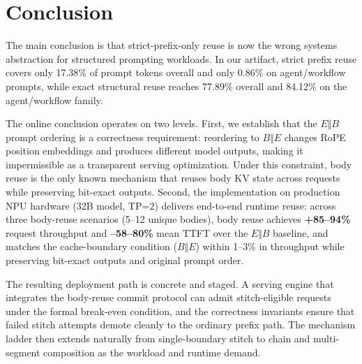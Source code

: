 \documentclass[conference]{IEEEtran}
\begin{document}
\section{Conclusion}

The main conclusion is that strict-prefix-only reuse is now the wrong systems abstraction for structured prompting workloads. In our artifact, strict prefix reuse covers only 17.38\% of prompt tokens overall and only 0.86\% on agent/workflow prompts, while exact structural reuse reaches 77.89\% overall and 84.12\% on the agent/workflow family.

The online conclusion operates on two levels. First, we establish that the $E \Vert B$ prompt ordering is a correctness requirement: reordering to $B \Vert E$ changes RoPE position embeddings and produces different model outputs, making it impermissible as a transparent serving optimization. Under this constraint, body reuse is the only known mechanism that reuses body KV state across requests while preserving bit-exact outputs. Second, the implementation on production NPU hardware (32B model, TP=2) delivers end-to-end runtime reuse: across three body-reuse scenarios (5--12 unique bodies), body reuse achieves \textbf{+85--94\%} request throughput and \textbf{--58--80\%} mean TTFT over the $E \Vert B$ baseline, and matches the cache-boundary condition ($B \Vert E$) within 1--3\% in throughput while preserving bit-exact outputs and original prompt order.

The resulting deployment path is concrete and staged. A serving engine that integrates the body-reuse commit protocol can admit stitch-eligible requests under the formal break-even condition, and the correctness invariants ensure that failed stitch attempts demote cleanly to the ordinary prefix path. The mechanism ladder then extends naturally from single-boundary stitch to chain and multi-segment composition as the workload and runtime demand.



\end{document}
